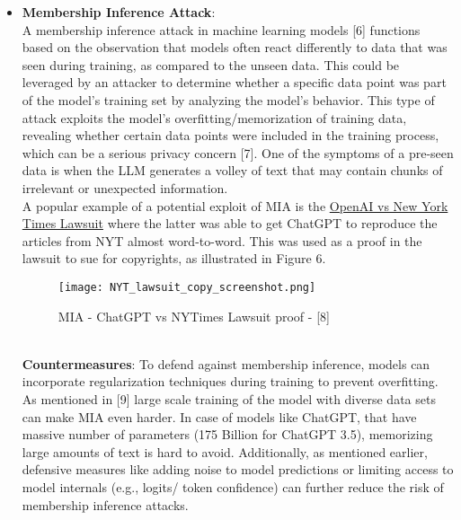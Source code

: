 \documentclass[12pt]{article}
\begin{document}
\begin{itemize}
        \item \textbf{Membership Inference Attack}: \\
        A membership inference attack in machine learning models [6] functions based on the observation that models often react differently to data that was seen during training, as compared to the unseen data. This could be leveraged by an attacker to determine whether a specific data point was part of the model’s training set by analyzing the model’s behavior. This type of attack exploits the model’s overfitting/memorization of training data, revealing whether certain data points were included in the training process, which can be a serious privacy concern [7]. One of the symptoms of a pre-seen data is when the LLM generates a volley of text that may contain chunks of irrelevant or unexpected information.\\

        A popular example of a potential exploit of MIA is the \href{https://www.nytimes.com/2023/12/27/business/media/new-york-times-open-ai-microsoft-lawsuit.html}{OpenAI vs New York Times Lawsuit} where the latter was able to get ChatGPT to reproduce the articles from NYT almost word-to-word. This was used as a proof in the lawsuit to sue for copyrights, as illustrated in Figure 6.
        \begin{figure}[h!]
            \centering
            \texttt{[image: NYT\_lawsuit\_copy\_screenshot.png]}
            \caption{MIA - ChatGPT vs NYTimes Lawsuit proof - [8]}
            \label{fig:enter-label}
        \end{figure}\\
        \textbf{Countermeasures}: To defend against membership inference, models can incorporate regularization techniques during training to prevent overfitting. As mentioned in [9] large scale training of the model with diverse data sets can make MIA even harder. In case of models like ChatGPT, that have massive number of parameters (175 Billion for ChatGPT 3.5), memorizing large amounts of text is hard to avoid. Additionally, as mentioned earlier, defensive measures like adding noise to model predictions or limiting access to model internals (e.g., logits/ token confidence) can further reduce the risk of membership inference attacks.
    \end{itemize}
\end{document}
